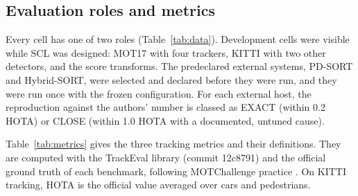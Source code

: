 \documentclass[pdflatex,sn-mathphys-num,iicol]{sn-jnl}
\newcommand{\scl}{SCL}
\begin{document}
\subsection{Evaluation roles and metrics}\label{sec:roles}
Every cell has one of two roles (Table~\ref{tab:data}). Development cells
were visible while \scl{} was designed: MOT17 with four trackers, KITTI
with two other detectors, and the score transforms. The predeclared external
systems, PD-SORT and Hybrid-SORT, were selected and declared before they were
run, and they were run once with the frozen configuration. For each external
host, the reproduction against the authors' number is classed as EXACT
(within 0.2 HOTA) or CLOSE (within 1.0 HOTA with a documented, untuned
cause).

\label{sec:metrics}Table~\ref{tab:metrics} gives the three tracking metrics
and their definitions. They are computed with the TrackEval library (commit
12c8791) and the official ground truth of each benchmark, following
MOTChallenge practice \cite{dendorfer2021motchallenge}. On KITTI tracking,
HOTA is the official value averaged over cars and pedestrians.
\end{document}
